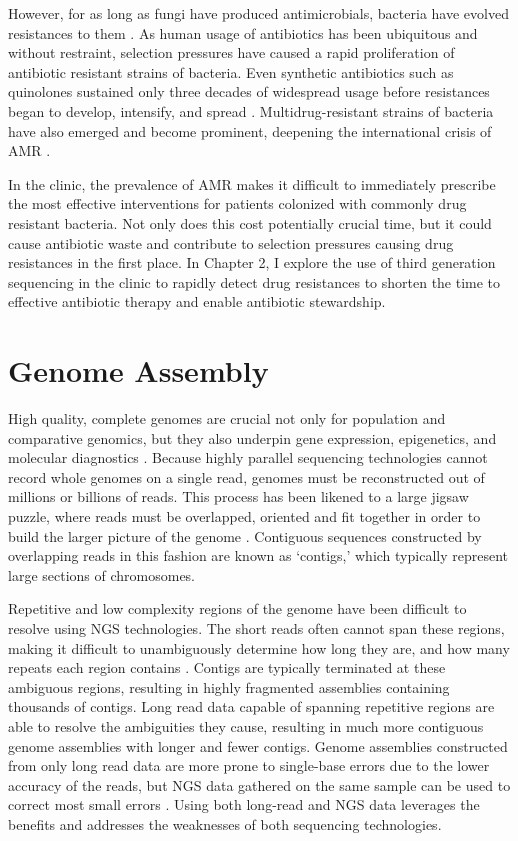 However, for as long as fungi have produced antimicrobials, bacteria have evolved resistances to them \citep{DCosta2011-yn}. As human usage of antibiotics has been ubiquitous and without restraint, selection pressures have caused a rapid proliferation of antibiotic resistant strains of bacteria. Even synthetic antibiotics such as quinolones sustained only three decades of widespread usage before resistances began to develop, intensify, and spread \citep{Laxminarayan2013-dk, Ruiz2012-cx}. Multidrug-resistant strains of bacteria have also emerged and become prominent, deepening the international crisis of AMR \citep{Tamma2014-dh}.

In the clinic, the prevalence of AMR makes it difficult to immediately prescribe the most effective interventions for patients colonized with commonly drug resistant bacteria. Not only does this cost potentially crucial time, but it could cause antibiotic waste and contribute to selection pressures causing drug resistances in the first place. In Chapter 2, I explore the use of third generation sequencing in the clinic to rapidly detect drug resistances to shorten the time to effective antibiotic therapy and enable antibiotic stewardship.

\section{Genome Assembly}
\label{sec:asm}
High quality, complete genomes are crucial not only for population and comparative genomics, but they also underpin gene expression, epigenetics, and molecular diagnostics \citep{Rhie2021-xb}. Because highly parallel sequencing technologies cannot record whole genomes on a single read, genomes must be reconstructed out of millions or billions of reads. This process has been likened to a large jigsaw puzzle, where reads must be overlapped, oriented and fit together in order to build the larger picture of the genome \citep{Sohn2018-lf}. Contiguous sequences constructed by overlapping reads in this fashion are known as ‘contigs,’ which typically represent large sections of chromosomes.

Repetitive and low complexity regions of the genome have been difficult to resolve using NGS technologies. The short reads often cannot span these regions, making it difficult to unambiguously determine how long they are, and how many repeats each region contains \citep{Paszkiewicz2010-yf}. Contigs are typically terminated at these ambiguous regions, resulting in highly fragmented assemblies containing thousands of contigs. Long read data capable of spanning repetitive regions are able to resolve the ambiguities they cause, resulting in much more contiguous genome assemblies with longer and fewer contigs. Genome assemblies constructed from only long read data are more prone to single-base errors due to the lower accuracy of the reads, but NGS data gathered on the same sample can be used to correct most small errors \citep{Goodwin2015-qs}. Using both long-read and NGS data leverages the benefits and addresses the weaknesses of both sequencing technologies.

